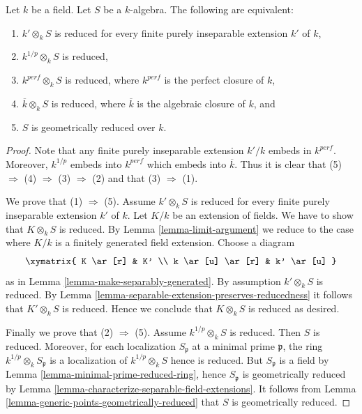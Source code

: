 \begin{lemma}
\label{lemma-geometrically-reduced-finite-purely-inseparable-extension}
Let $k$ be a field. Let $S$ be a $k$-algebra.
The following are equivalent:
\begin{enumerate}
\item $k' \otimes_k S$ is reduced for every finite
purely inseparable extension $k'$ of $k$,
\item $k^{1/p} \otimes_k S$ is reduced,
\item $k^{perf} \otimes_k S$ is reduced, where $k^{perf}$ is the
perfect closure of $k$,
\item $\overline{k} \otimes_k S$ is reduced, where $\overline{k}$ is the
algebraic closure of $k$, and
\item $S$ is geometrically reduced over $k$.
\end{enumerate}
\end{lemma}

\begin{proof}
Note that any finite purely inseparable extension $k'/k$ embeds
in $k^{perf}$. Moreover, $k^{1/p}$ embeds into $k^{perf}$ which embeds
into $\overline{k}$. Thus it is
clear that (5) $\Rightarrow$ (4) $\Rightarrow$ (3) $\Rightarrow$ (2)
and that (3) $\Rightarrow$ (1).

\medskip\noindent
We prove that (1) $\Rightarrow$ (5).
Assume $k' \otimes_k S$ is reduced for every finite
purely inseparable extension $k'$ of $k$. Let $K/k$ be
an extension of fields. We have to show that $K \otimes_k S$
is reduced. By Lemma \ref{lemma-limit-argument} we reduce to the case where
$K/k$ is a finitely generated field extension. Choose a diagram
$$
\xymatrix{
K \ar[r] & K' \\
k \ar[u] \ar[r] & k' \ar[u]
}
$$
as in Lemma \ref{lemma-make-separably-generated}.
By assumption $k' \otimes_k S$ is reduced.
By Lemma \ref{lemma-separable-extension-preserves-reducedness}
it follows that $K' \otimes_k S$ is reduced.
Hence we conclude that $K \otimes_k S$ is reduced as desired.

\medskip\noindent
Finally we prove that (2) $\Rightarrow$ (5).
Assume $k^{1/p} \otimes_k S$ is reduced. Then $S$ is reduced.
Moreover, for each localization $S_{\mathfrak p}$ at a minimal
prime $\mathfrak p$, the ring $k^{1/p}\otimes_k S_{\mathfrak p}$
is a localization of $k^{1/p} \otimes_k S$ hence is reduced.
But $S_{\mathfrak p}$ is a field by
Lemma \ref{lemma-minimal-prime-reduced-ring},
hence $S_{\mathfrak p}$ is geometrically reduced by
Lemma \ref{lemma-characterize-separable-field-extensions}.
It follows from Lemma \ref{lemma-generic-points-geometrically-reduced}
that $S$ is geometrically reduced.
\end{proof}